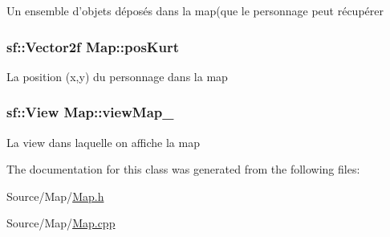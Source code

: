 Un ensemble d'objets déposés dans la map(que le personnage peut récupérer \hypertarget{classMap_a186e58887b77964c59209512d82b49d8}{
\subsubsection[{pos\-Kurt}]{\setlength{\rightskip}{0pt plus 5cm}sf\-::\-Vector2f Map\-::pos\-Kurt\hspace{0.3cm}{\ttfamily [protected]}}}\label{classMap_a186e58887b77964c59209512d82b49d8}
La position (x,y) du personnage dans la map \hypertarget{classMap_af8e91c6748c37dddbf1f6375019e4e65}{
\subsubsection[{view\-Map\-\_\-}]{\setlength{\rightskip}{0pt plus 5cm}sf\-::\-View Map\-::view\-Map\-\_\-\hspace{0.3cm}{\ttfamily [protected]}}}\label{classMap_af8e91c6748c37dddbf1f6375019e4e65}
La view dans laquelle on affiche la map 

The documentation for this class was generated from the following files\-:\begin{DoxyCompactItemize}
\item 
Source/\-Map/\hyperlink{Map_8h}{Map.\-h}\item 
Source/\-Map/\hyperlink{Map_8cpp}{Map.\-cpp}\end{DoxyCompactItemize}
